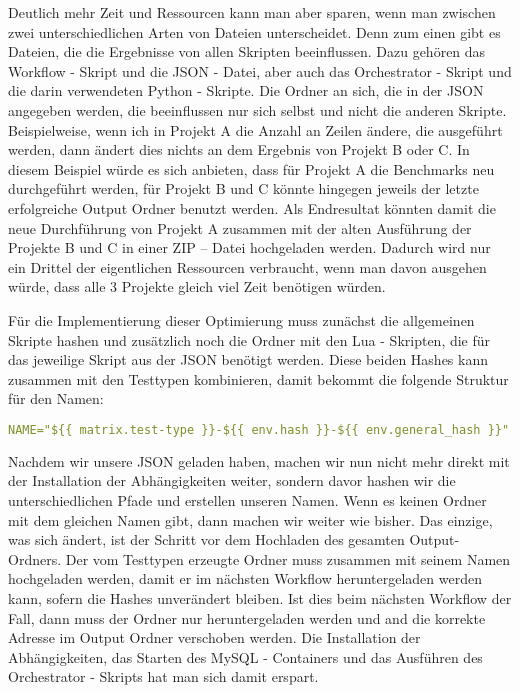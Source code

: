 Deutlich mehr Zeit und Ressourcen kann man aber sparen, wenn man zwischen zwei unterschiedlichen Arten von Dateien unterscheidet.
Denn zum einen gibt es Dateien, die die Ergebnisse von allen Skripten beeinflussen.
Dazu gehören das Workflow - Skript und die JSON - Datei, aber auch das Orchestrator - Skript und die darin verwendeten Python - Skripte.
Die Ordner an sich, die in der JSON angegeben werden, die beeinflussen nur sich selbst und nicht die anderen Skripte.
Beispielweise, wenn ich in Projekt A die Anzahl an Zeilen ändere, die ausgeführt werden, dann ändert dies nichts an dem Ergebnis von Projekt B oder C.
In diesem Beispiel würde es sich anbieten, dass für Projekt A die Benchmarks neu durchgeführt werden, für Projekt B und C könnte hingegen jeweils der letzte erfolgreiche Output Ordner benutzt werden.
Als Endresultat könnten damit die neue Durchführung von Projekt A zusammen mit der alten Ausführung der Projekte B und C in einer ZIP – Datei hochgeladen werden.
Dadurch wird nur ein Drittel der eigentlichen Ressourcen verbraucht, wenn man davon ausgehen würde, dass alle 3 Projekte gleich viel Zeit benötigen würden.

Für die Implementierung dieser Optimierung muss zunächst die allgemeinen Skripte hashen und zusätzlich noch die Ordner mit den Lua - Skripten, die für das jeweilige Skript aus der JSON benötigt werden.
Diese beiden Hashes kann zusammen mit den Testtypen kombinieren, damit bekommt die folgende Struktur für den Namen:

\begin{lstlisting}[language=yaml,label={lst:hash_name},style=custom_daniel]
NAME="${{ matrix.test-type }}-${{ env.hash }}-${{ env.general_hash }}"
\end{lstlisting}

Nachdem wir unsere JSON geladen haben, machen wir nun nicht mehr direkt mit der Installation der Abhängigkeiten weiter, sondern davor hashen wir die unterschiedlichen Pfade und erstellen unseren Namen.
Wenn es keinen Ordner mit dem gleichen Namen gibt, dann machen wir weiter wie bisher.
Das einzige, was sich ändert, ist der Schritt vor dem Hochladen des gesamten Output-Ordners.
Der vom Testtypen erzeugte Ordner muss zusammen mit seinem Namen hochgeladen werden, damit er im nächsten Workflow heruntergeladen werden kann, sofern die Hashes unverändert bleiben.
Ist dies beim nächsten Workflow der Fall, dann muss der Ordner nur heruntergeladen werden und and die korrekte Adresse im Output Ordner verschoben werden.
Die Installation der Abhängigkeiten, das Starten des MySQL - Containers und das Ausführen des Orchestrator - Skripts hat man sich damit erspart.

